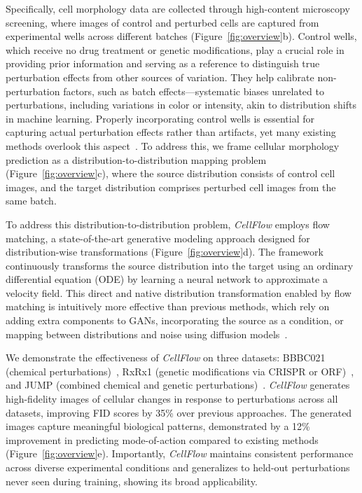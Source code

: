 Specifically, cell morphology data are collected through high-content microscopy screening, where images of control and perturbed cells are captured from experimental wells across different batches (Figure~\ref{fig:overview}b). Control wells, which receive no drug treatment or genetic modifications, play a crucial role in providing prior information and serving as a reference to distinguish true perturbation effects from other sources of variation. They help calibrate non-perturbation factors, such as batch effects—systematic biases unrelated to perturbations, including variations in color or intensity, akin to distribution shifts in machine learning. Properly incorporating control wells is essential for capturing actual perturbation effects rather than artifacts, yet many existing methods overlook this aspect~\cite{yang2021mol2image,navidi2024morphodiff,cook2024diffusion}. To address this, we frame cellular morphology prediction as a distribution-to-distribution mapping problem (Figure~\ref{fig:overview}c), where the source distribution consists of control cell images, and the target distribution comprises perturbed cell images from the same batch.

To address this distribution-to-distribution problem, \emph{CellFlow} employs flow matching, a state-of-the-art generative modeling approach designed for distribution-wise transformations (Figure~\ref{fig:overview}d). The framework continuously transforms the source distribution into the target using an ordinary differential equation (ODE) by learning a neural network to approximate a velocity field. This direct and native distribution transformation enabled by flow matching is intuitively more effective than previous methods, which rely on adding extra components to GANs, incorporating the source as a condition, or mapping between distributions and noise using diffusion models~\cite{palma2023predicting,hung2024lumic,bourou2024phendiff}.

We demonstrate the effectiveness of \emph{CellFlow} on three datasets: BBBC021 (chemical perturbations)~\cite{caie2010high}, RxRx1 (genetic modifications via CRISPR or ORF)~\cite{sypetkowski2023rxrx1}, and JUMP (combined chemical and genetic perturbations)~\cite{chandrasekaran2023jump}. \emph{CellFlow} generates high-fidelity images of cellular changes in response to perturbations across all datasets, improving FID scores by 35\% over previous approaches. The generated images capture meaningful biological patterns, demonstrated by a 12\% improvement in predicting mode-of-action compared to existing methods (Figure~\ref{fig:overview}e). Importantly, \emph{CellFlow} maintains consistent performance across diverse experimental conditions and generalizes to held-out perturbations never seen during training, showing its broad applicability. 

